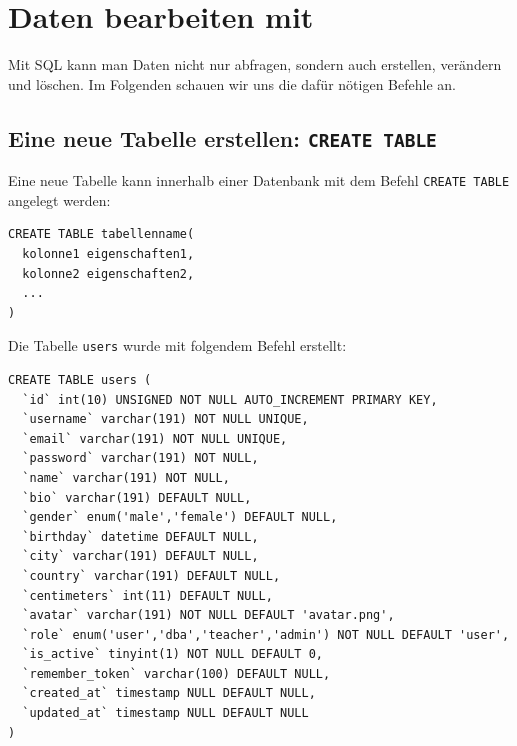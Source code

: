 \chapter{Daten bearbeiten mit \texorpdfstring{}{SQL}}\label{ch:daten-bearbeiten}
Mit \gls{SQL} kann man Daten nicht nur abfragen, sondern auch erstellen, verändern und löschen. Im Folgenden schauen wir uns die dafür nötigen Befehle an.

\section{Eine neue Tabelle erstellen: \texorpdfstring{\lstinline|CREATE TABLE|}{CREATE TABLE}}
\label{subsec:create-table}
Eine neue Tabelle kann innerhalb einer Datenbank mit dem Befehl \lstinline|CREATE TABLE| angelegt werden:

\begin{lstlisting}
CREATE TABLE tabellenname(
  kolonne1 eigenschaften1,
  kolonne2 eigenschaften2,
  ...
)
\end{lstlisting}

\begin{myexample}
\label{ex:sql-create}
Die Tabelle \texttt{users} wurde mit folgendem Befehl erstellt:

\begin{lstlisting}
CREATE TABLE users (
  `id` int(10) UNSIGNED NOT NULL AUTO_INCREMENT PRIMARY KEY,
  `username` varchar(191) NOT NULL UNIQUE,
  `email` varchar(191) NOT NULL UNIQUE,
  `password` varchar(191) NOT NULL,
  `name` varchar(191) NOT NULL,
  `bio` varchar(191) DEFAULT NULL,
  `gender` enum('male','female') DEFAULT NULL,
  `birthday` datetime DEFAULT NULL,
  `city` varchar(191) DEFAULT NULL,
  `country` varchar(191) DEFAULT NULL,
  `centimeters` int(11) DEFAULT NULL,
  `avatar` varchar(191) NOT NULL DEFAULT 'avatar.png',
  `role` enum('user','dba','teacher','admin') NOT NULL DEFAULT 'user',
  `is_active` tinyint(1) NOT NULL DEFAULT 0,
  `remember_token` varchar(100) DEFAULT NULL,
  `created_at` timestamp NULL DEFAULT NULL,
  `updated_at` timestamp NULL DEFAULT NULL
)
\end{lstlisting}
\end{myexample}

